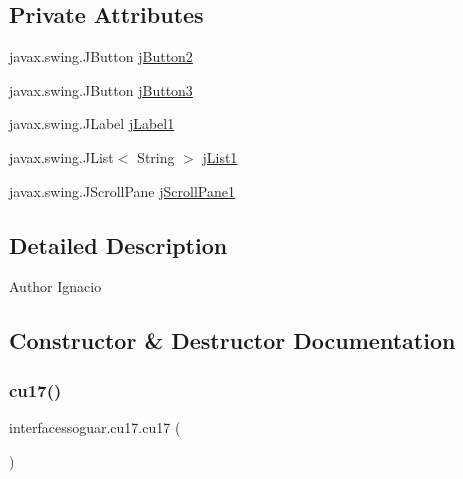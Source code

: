 \subsection*{Private Attributes}
\begin{DoxyCompactItemize}
\item 
javax.\+swing.\+J\+Button \mbox{\hyperlink{classinterfacessoguar_1_1cu17_ab0ec1e2337c482ba36b861315213b157}{j\+Button2}}
\item 
javax.\+swing.\+J\+Button \mbox{\hyperlink{classinterfacessoguar_1_1cu17_a5df410d0f4d1de0038eed02645f3c824}{j\+Button3}}
\item 
javax.\+swing.\+J\+Label \mbox{\hyperlink{classinterfacessoguar_1_1cu17_aa880b94b17154b9daee38aa63d559425}{j\+Label1}}
\item 
javax.\+swing.\+J\+List$<$ String $>$ \mbox{\hyperlink{classinterfacessoguar_1_1cu17_a524c114f85a8d7a1c8df04d268ca95c9}{j\+List1}}
\item 
javax.\+swing.\+J\+Scroll\+Pane \mbox{\hyperlink{classinterfacessoguar_1_1cu17_a02bf07a587e2b0c668b21a616369e5cb}{j\+Scroll\+Pane1}}
\end{DoxyCompactItemize}


\subsection{Detailed Description}
\begin{DoxyAuthor}{Author}
Ignacio 
\end{DoxyAuthor}


\subsection{Constructor \& Destructor Documentation}
\mbox{\label{classinterfacessoguar_1_1cu17_a6cfceedd011127f9629cc5a686dbe81a}} 
\subsubsection{\texorpdfstring{cu17()}{cu17()}}
{\footnotesize\ttfamily interfacessoguar.\+cu17.\+cu17 (\begin{DoxyParamCaption}{ }\end{DoxyParamCaption})\hspace{0.3cm}{\ttfamily [inline]}}


